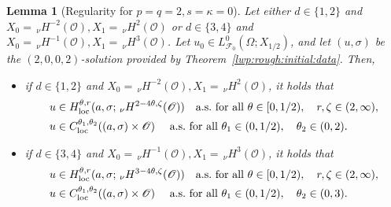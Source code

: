 \documentclass[reqno]{amsart}
\newtheorem{lemma}[Satz]{Lemma}
\newcommand{\F}{\mathscr{F}}
\newcommand{\sO}{\mathscr{O}}
\newcommand{\1}{\mathbf{1}}
\newcommand{\loc}{\textup{loc}}
\newcommand{\nH}{\ensuremath{\,_\nu H}}
\newcommand{\bpsn}[1]{\ensuremath{\nH^{#1}(\sO)}}
\begin{document}
	\begin{lemma}[Regularity for $p=q=2, s=\kappa=0$]\label{thm:regularization:rough:initial:data:L2L2}
		Let either $d\in \{1,2\}$ and $X_0=\bpsn{-2}, X_1=\bpsn{2}$ or  $d\in \{3,4\}$ and $X_0=\bpsn{-1}, X_1=\bpsn{3}$.
 Let $u_0\in L^0_{\F_0}(\Omega; X_{1/2})$, and let $(u,\sigma)$ be the $(2,0,0,2)$-solution provided by Theorem~\ref{lwp:rough:initial:data}. Then, 
		\begin{itemize}
			\item if $d\in \{1,2\}$ and $X_0=\bpsn{-2}, X_1=\bpsn{2}$, it holds that 
				\begin{align}
				u&\in H_{\loc}^{\theta,r}(a,\sigma; \nH^{2-4\theta,\zeta}(\sO))\quad \text{a.s.\ for all }\theta\in[0,1/2),\quad r,\zeta\in(2,\infty),\\
				u&\in C_{\loc}^{\theta_1,\theta_2}((a,\sigma)\times\sO) \quad \text{ a.s.\ for all }\theta_1\in (0,1/2),\quad  \theta_2\in (0,2).
			\end{align}
			\item if $d\in \{3,4\}$ and $X_0=\bpsn{-1}, X_1=\bpsn{3}$, it holds that 
			\begin{align}
				u&\in H_{\loc}^{\theta,r}(a,\sigma; \nH^{3-4\theta,\zeta}(\sO))\quad \text{a.s.\ for all }\theta\in[0,1/2),\quad r,\zeta\in(2,\infty),\\
				u&\in C_{\loc}^{\theta_1,\theta_2}((a,\sigma)\times\sO) \quad \text{ a.s.\ for all }\theta_1\in (0,1/2),\quad \theta_2\in (0,3).
			\end{align}
		\end{itemize}
	\end{lemma}
\end{document}
